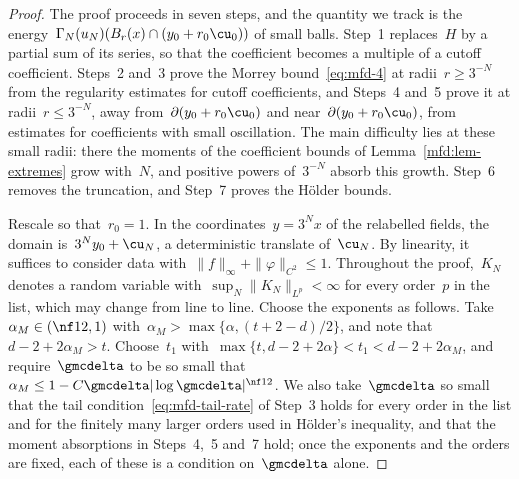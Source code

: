 \documentclass[11pt]{amsart}
\begin{document}
\begin{proof}
The proof proceeds in seven steps, and the quantity we track is the energy~$\Gamma_N(u_N)(B_r(x)\cap(y_0+r_0\cu_0))$ of small balls. Step~1 replaces~$H$ by a partial sum of its series, so that the coefficient becomes a multiple of a cutoff coefficient. Steps~2 and~3 prove the Morrey bound~\eqref{eq:mfd-4} at radii~$r\geq3^{-N}$ from the regularity estimates for cutoff coefficients, and Steps~4 and~5 prove it at radii~$r\leq3^{-N}$, away from~$\partial(y_0+r_0\cu_0)$ and near~$\partial(y_0+r_0\cu_0)$, from estimates for coefficients with small oscillation. The main difficulty lies at these small radii: there the moments of the coefficient bounds of Lemma~\ref{mfd:lem-extremes} grow with~$N$, and positive powers of~$3^{-N}$ absorb this growth. Step~6 removes the truncation, and Step~7 proves the H\"older bounds.

\smallskip

Rescale so that~$r_0=1$. In the coordinates~$y=3^Nx$ of the relabelled fields, the domain is~$3^Ny_0+\cu_N$, a deterministic translate of~$\cu_N$. By linearity, it suffices to consider data with~$\|f\|_\infty+\|\varphi\|_{C^2}\leq1$. Throughout the proof,~$K_N$ denotes a random variable with~$\sup_N\|K_N\|_{L^p}<\infty$ for every order~$p$ in the list, which may change from line to line. Choose the exponents as follows. Take~$\alpha_M\in(\nf12,1)$ with~$\alpha_M>\max\{\alpha,(t+2-d)/2\}$, and note that~$d-2+2\alpha_M>t$. Choose~$t_1$ with~$\max\{t,d-2+2\alpha\}<t_1<d-2+2\alpha_M$, and require~$\gmcdelta$ to be so small that~$\alpha_M\leq1-C\gmcdelta|\log\gmcdelta|^{\nf12}$. We also take~$\gmcdelta$ so small that the tail condition~\eqref{eq:mfd-tail-rate} of Step~3 holds for every order in the list and for the finitely many larger orders used in H\"older's inequality, and that the moment absorptions in Steps~4,~5 and~7 hold; once the exponents and the orders are fixed, each of these is a condition on~$\gmcdelta$ alone.

\smallskip


\end{proof}
\end{document}
